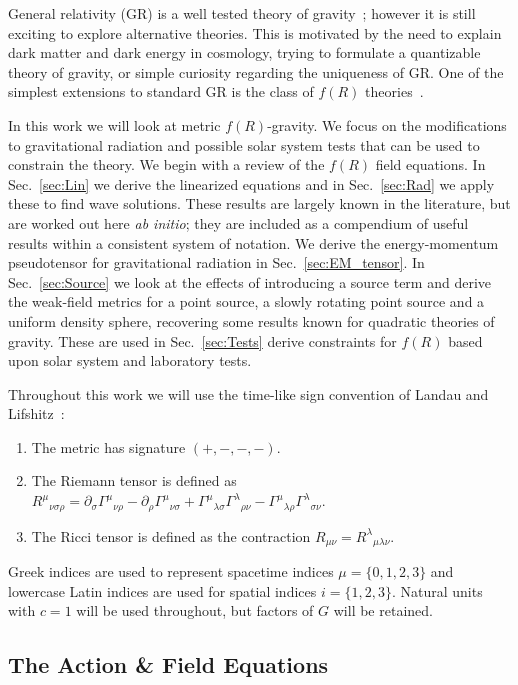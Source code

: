 \documentclass[aps,prd,amsfonts,amssymb,amsmath,nofootinbib,reprint,showpacs]{revtex4-1}
\newcommand{\secref}[1]{Sec.\ \ref{sec:#1}}
\begin{document}
General relativity (GR) is a well tested theory of gravity~\cite{Will2006}; however it is still exciting to explore alternative theories. This is motivated by the need to explain dark matter and dark energy in cosmology, trying to formulate a quantizable theory of gravity, or simple curiosity regarding the uniqueness of GR. One of the simplest extensions to standard GR is the class of $f(R)$ theories~\cite{Sotiriou2010, DeFelice2010}.

In this work we will look at metric $f(R)$-gravity. We focus on the modifications to gravitational radiation and possible solar system tests that can be used to constrain the theory. We begin with a review of the $f(R)$ field equations. In \secref{Lin} we derive the linearized equations and in \secref{Rad} we apply these to find wave solutions. These results are largely known in the literature, but are worked out here {\it ab initio}; they are included as a compendium of useful results within a consistent system of notation. We derive the energy-momentum pseudotensor for gravitational radiation in \secref{EM_tensor}. In \secref{Source} we look at the effects of introducing a source term and derive the weak-field metrics for a point source, a slowly rotating point source and a uniform density sphere, recovering some results known for quadratic theories of gravity. These are used in \secref{Tests} derive constraints for $f(R)$ based upon solar system and laboratory tests. 

Throughout this work we will use the time-like sign convention of Landau and Lifshitz~\cite{Landau1975}:
\begin{enumerate}
\item The metric has signature $(+,-,-,-)$.
\item The Riemann tensor is defined as ${R^\mu}_{\nu\sigma\rho} = \partial_\sigma {\Gamma^\mu}_{\nu\rho} - \partial_\rho {\Gamma^\mu}_{\nu\sigma} + {\Gamma^\mu}_{\lambda\sigma}{\Gamma^\lambda}_{\rho\nu} - {\Gamma^\mu}_{\lambda\rho}{\Gamma^\lambda}_{\sigma\nu}$.
\item The Ricci tensor is defined as the contraction $R_{\mu\nu} = {R^\lambda}_{\mu\lambda\nu}$.
\end{enumerate}
Greek indices are used to represent spacetime indices $\mu = \{0,1,2,3\}$ and lowercase Latin indices are used for spatial indices $i = \{1,2,3\}$. Natural units with $c = 1$ will be used throughout, but factors of $G$ will be retained.

\subsection{The Action \& Field Equations\label{sec:Action}}
\end{document}
